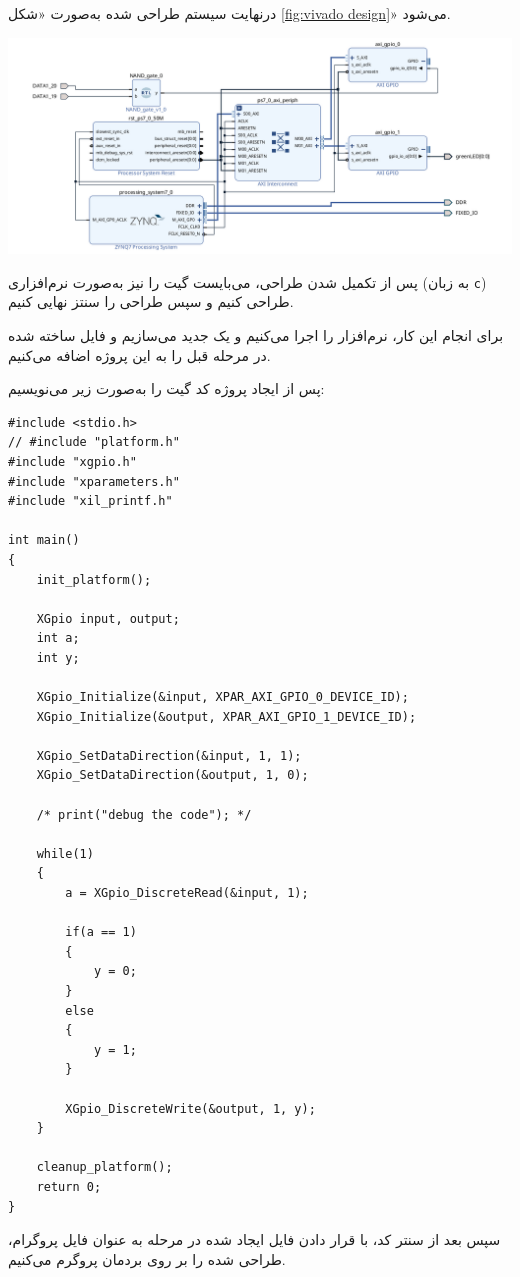 درنهایت سیستم طراحی شده به‌صورت «شکل \ref{fig:vivado design}» می‌شود. 

\begin{center}
	\includegraphics*[width=1\linewidth]{pics/img3.png}
	\label{fig:vivado design}
\end{center}

پس از تکمیل شدن طراحی، می‌بایست گیت  را نیز به‌صورت نرم‌افزاری (به زبان \texttt{c}) طراحی کنیم و سپس طراحی را سنتز نهایی کنیم.

برای انجام این کار، نرم‌افزار  را اجرا می‌کنیم و یک  جدید می‌سازیم و فایل \texttt{} ساخته شده در  مرحله قبل را به این پروژه اضافه می‌کنیم.

پس از ایجاد پروژه کد گیت  را به‌صورت زیر می‌نویسیم:

\begin{latin}
\begin{lstlisting}[label=case_sens, caption=Not Module for PS]
#include <stdio.h>
// #include "platform.h"
#include "xgpio.h"
#include "xparameters.h"
#include "xil_printf.h"

int main()
{
	init_platform();
	
	XGpio input, output;
	int a;
	int y;
	
	XGpio_Initialize(&input, XPAR_AXI_GPIO_0_DEVICE_ID);
	XGpio_Initialize(&output, XPAR_AXI_GPIO_1_DEVICE_ID);
	
	XGpio_SetDataDirection(&input, 1, 1);
	XGpio_SetDataDirection(&output, 1, 0);
	
	/* print("debug the code"); */
	
	while(1)
	{
		a = XGpio_DiscreteRead(&input, 1);
		
		if(a == 1)
		{
			y = 0;
		}
		else
		{
			y = 1;
		}
		
		XGpio_DiscreteWrite(&output, 1, y);
	}
	
	cleanup_platform();
	return 0;
}
\end{lstlisting} 
\end{latin}



سپس بعد از سنتر کد، با قرار دادن فایل  ایجاد شده در مرحله  به عنوان فایل پروگرام، طراحی  شده را بر روی بردمان پروگرم می‌کنیم.



